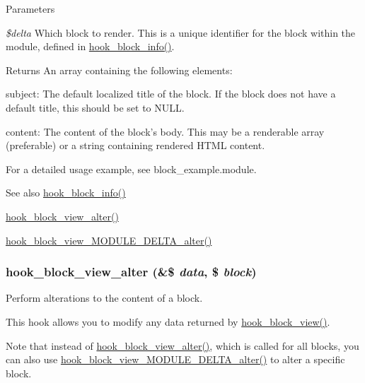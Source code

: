 \begin{DoxyParams}{Parameters}
\item[{\em \$delta}]Which block to render. This is a unique identifier for the block within the module, defined in \hyperlink{group__hooks_ga2bd926c3e90deeba0c3ba64fb3c64d73}{hook\_\-block\_\-info()}.\end{DoxyParams}
\begin{DoxyReturn}{Returns}
An array containing the following elements:
\begin{DoxyItemize}
\item subject: The default localized title of the block. If the block does not have a default title, this should be set to NULL.
\item content: The content of the block's body. This may be a renderable array (preferable) or a string containing rendered HTML content.
\end{DoxyItemize}
\end{DoxyReturn}
For a detailed usage example, see block\_\-example.module.

\begin{DoxySeeAlso}{See also}
\hyperlink{group__hooks_ga2bd926c3e90deeba0c3ba64fb3c64d73}{hook\_\-block\_\-info()} 

\hyperlink{group__hooks_ga65868e8e24bb04e5eb9e533c4d413b10}{hook\_\-block\_\-view\_\-alter()} 

\hyperlink{group__hooks_ga8888fb6b153c6a93238eebf2be51eb18}{hook\_\-block\_\-view\_\-MODULE\_\-DELTA\_\-alter()} 
\end{DoxySeeAlso}
\hypertarget{group__hooks_ga65868e8e24bb04e5eb9e533c4d413b10}{
\subsubsection[{hook\_\-block\_\-view\_\-alter}]{\setlength{\rightskip}{0pt plus 5cm}hook\_\-block\_\-view\_\-alter (\&\$ {\em data}, \/  \$ {\em block})}}
\label{group__hooks_ga65868e8e24bb04e5eb9e533c4d413b10}
Perform alterations to the content of a block.

This hook allows you to modify any data returned by \hyperlink{group__hooks_gaa14092a3e74cdc57aa295100cfd6860d}{hook\_\-block\_\-view()}.

Note that instead of \hyperlink{group__hooks_ga65868e8e24bb04e5eb9e533c4d413b10}{hook\_\-block\_\-view\_\-alter()}, which is called for all blocks, you can also use \hyperlink{group__hooks_ga8888fb6b153c6a93238eebf2be51eb18}{hook\_\-block\_\-view\_\-MODULE\_\-DELTA\_\-alter()} to alter a specific block.


